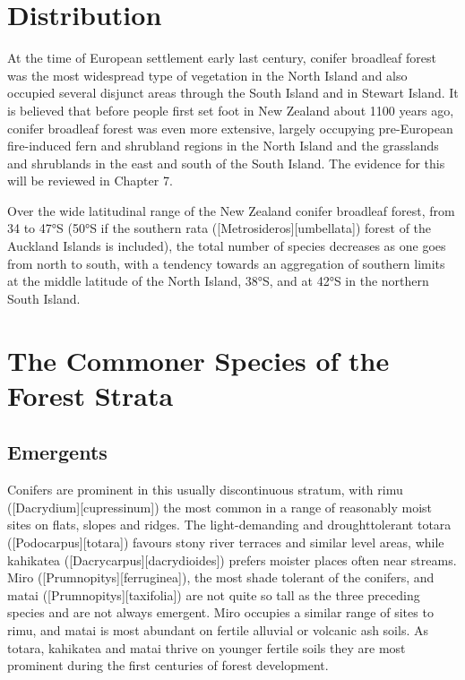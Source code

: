 \section{Distribution}

At the time of European settlement early last century, conifer broadleaf forest was the most widespread type of vegetation in the North Island and also occupied several disjunct areas through the South Island and in Stewart Island.
It is believed that before people first set foot in New Zealand about 1100 years ago, conifer broadleaf forest was even more extensive, largely occupying pre-European fire-induced fern and shrubland regions in the North Island and the grasslands and shrublands in the east and south of the South Island.
The evidence for this will be reviewed in Chapter 7.

Over the wide latitudinal range of the New Zealand conifer broadleaf forest, from 34 to 47°S (50°S if the southern rata ([Metrosideros][umbellata]) forest of the Auckland Islands is included), the total number of species decreases as one goes from north to south, with a tendency towards an aggregation of southern limits at the middle latitude of the North Island, 38°S, and at 42°S in the northern South Island.

\section{The Commoner Species of the Forest Strata}

\subsection{Emergents}

Conifers are prominent in this usually discontinuous stratum, with rimu ([Dacrydium][cupressinum]) the most common in a range of reasonably moist sites on flats, slopes and ridges.
The light-demanding and droughttolerant totara ([Podocarpus][totara]) favours stony river terraces and similar level areas, while kahikatea ([Dacrycarpus][dacrydioides]) prefers moister places often near streams.
Miro ([Prumnopitys][ferruginea]), the most shade tolerant of the conifers, and matai ([Prumnopitys][taxifolia]) are not quite so tall as the three preceding species and are not always emergent.
Miro occupies a similar range of sites to rimu, and matai is most abundant on fertile alluvial or volcanic ash soils.
As totara, kahikatea and matai thrive on younger fertile soils they are most prominent during the first centuries of forest development.

